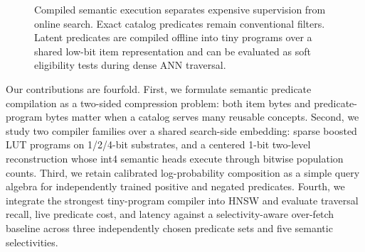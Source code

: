 \begin{figure}[t]
\centering
{}
\caption{Compiled semantic execution separates expensive supervision from online search. Exact catalog predicates remain conventional filters. Latent predicates are compiled offline into tiny programs over a shared low-bit item representation and can be evaluated as soft eligibility tests during dense ANN traversal.}
\label{fig:architecture}
\end{figure}

Our contributions are fourfold. First, we formulate semantic predicate compilation as a two-sided compression problem: both item bytes and predicate-program bytes matter when a catalog serves many reusable concepts. Second, we study two compiler families over a shared search-side embedding: sparse boosted LUT programs on 1/2/4-bit substrates, and a centered 1-bit two-level reconstruction whose int4 semantic heads execute through bitwise population counts. Third, we retain calibrated log-probability composition as a simple query algebra for independently trained positive and negated predicates. Fourth, we integrate the strongest tiny-program compiler into HNSW and evaluate traversal recall, live predicate cost, and latency against a selectivity-aware over-fetch baseline across three independently chosen predicate sets and five semantic selectivities.

